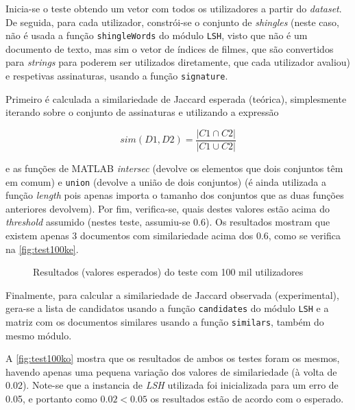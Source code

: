 \documentclass[a4paper,11pt,openright,oneside]{report}
\begin{document}
Inicia-se o teste obtendo um vetor com todos os utilizadores a partir do \textit{dataset}. De seguida, para cada utilizador, constrói-se o conjunto de \textit{shingles} (neste caso, não é usada a função \texttt{shingleWords} do módulo \texttt{LSH}, visto que não é um documento de texto, mas sim o vetor de índices de filmes, que são convertidos para \textit{strings} para poderem ser utilizados diretamente, que cada utilizador avaliou) e respetivas assinaturas, usando a função \texttt{signature}. 

Primeiro é calculada a similariedade de Jaccard esperada (teórica), simplesmente iterando sobre o conjunto de assinaturas e utilizando a expressão 

$$ sim(D1, D2) = \frac{|C1\cap C2|}{|C1\cup C2|} $$

e as funções de MATLAB \textit{intersec} (devolve os elementos que dois conjuntos têm em comum) e \texttt{union} (devolve a união de dois conjuntos) (é ainda utilizada a função \textit{length} pois apenas importa o tamanho dos conjuntos que as duas funções anteriores devolvem). Por fim, verifica-se, quais destes valores estão acima do \textit{threshold} assumido (nestes teste, assumiu-se 0.6). Os resultados mostram que existem apenas 3 documentos com similariedade acima dos 0.6, como se verifica na \autoref{fig:test100ke}.

\begin{figure}[ht]	
\center
{}
\caption{Resultados (valores esperados) do teste com 100 mil utilizadores}
\label{fig:test100ke}
\end{figure}

Finalmente, para calcular a similariedade de Jaccard observada (experimental), gera-se a lista de candidatos usando a função \texttt{candidates} do módulo \texttt{LSH} e a matriz com os documentos similares usando a função \texttt{similars}, também do mesmo módulo.

A \autoref{fig:test100ko} mostra que os resultados de ambos os testes foram os mesmos, havendo apenas uma pequena variação dos valores de similariedade (à volta de 0.02). Note-se que a instancia de \textit{LSH} utilizada foi inicializada para um erro de 0.05, e portanto como $0.02 < 0.05$ os resultados estão de acordo com o esperado.
\end{document}
